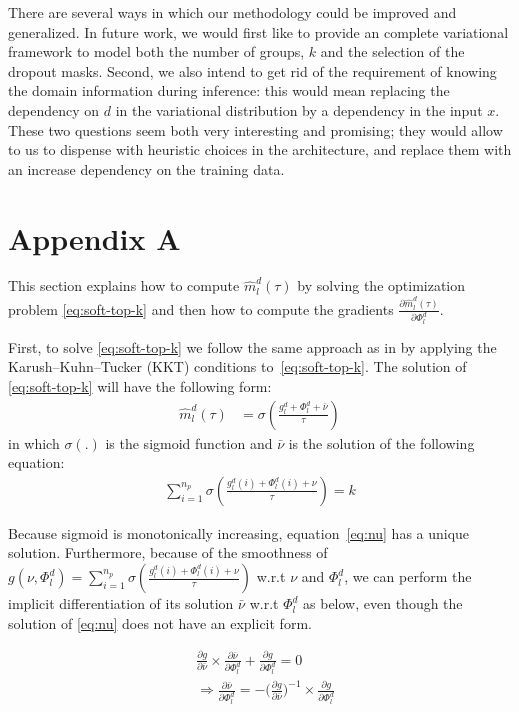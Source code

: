 \documentclass[11pt]{article}
\begin{document}
There are several ways in which our methodology could be improved and generalized. In future work, we would first like to provide an complete variational framework to model both the number of groups, $k$ and the selection of the dropout masks. Second, we also intend to get rid of the requirement of knowing the domain information during inference: this would mean replacing the dependency on $d$ in the variational distribution by a dependency in the input $x$. These two questions seem both very interesting and promising; they would allow to us to dispense with heuristic choices in the architecture, and replace them with an increase dependency on the training data.



\appendix
\section{Appendix A}
\label{appendix:a}
This section explains how to compute $\hat{m}_l^d(\tau)$ by solving the optimization problem \eqref{eq:soft-top-k} and then how to compute the gradients $\frac{\partial \hat{m}_l^d(\tau)}{\partial \Phi_l^d}$.

First, to solve \eqref{eq:soft-top-k} we follow the same approach as in \cite{amos19lml,amos20differential} by applying the Karush–Kuhn–Tucker (KKT) conditions to~\eqref{eq:soft-top-k}. The solution of \eqref{eq:soft-top-k} will have the following form:
\begin{align}
\hat{m}_l^d(\tau) &= \sigma(\frac{g_l^d + \Phi_l^d + \bar{\nu}}{\tau}) \label{eq:soft-m}
\end{align}
in which $\sigma(.)$ is the sigmoid function and $\bar{\nu}$ is the solution of the following equation:
\begin{align}
\displaystyle{\mathop{\sum}_{i=1}^{n_p}} \sigma(\frac{g_l^d(i) + \Phi_l^d(i) + \nu}{\tau}) = k \label{eq:nu}
\end{align}

Because sigmoid is monotonically increasing, equation~\eqref{eq:nu} has a unique solution. Furthermore,  because of the smoothness of $g(\nu,\Phi_l^d) = \displaystyle{\mathop{\sum}_{i=1}^{n_p}} \sigma(\frac{g_l^d(i) + \Phi_l^d(i) + \nu}{\tau})$ w.r.t $\nu$ and $\Phi_l^d$, we can perform the implicit differentiation of its solution $\bar{\nu}$ w.r.t $\Phi_l^d$ as below, even though the solution of \eqref{eq:nu} does not have an explicit form.

\begin{align*}
&\frac{\partial g}{\partial \bar{\nu}} \times \frac{\partial \bar{\nu}}{\partial \Phi_l^d} + \frac{\partial g}{\partial \Phi_l^d} = 0 \\
& \Rightarrow \frac{\partial \bar{\nu}}{\partial \Phi_l^d} = - \big(\frac{\partial g}{\partial \bar{\nu}}\big)^{-1} \times \frac{\partial g}{\partial \Phi_l^d}
\end{align*}
\end{document}
